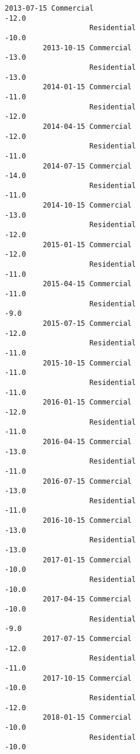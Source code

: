 \documentclass[11pt]{article}
\begin{document}
\begin{Verbatim}[commandchars=\\\{\}]
         2013-07-15 Commercial                                             -12.0   
                    Residential                                            -10.0   
         2013-10-15 Commercial                                             -13.0   
                    Residential                                            -13.0   
         2014-01-15 Commercial                                             -11.0   
                    Residential                                            -12.0   
         2014-04-15 Commercial                                             -12.0   
                    Residential                                            -11.0   
         2014-07-15 Commercial                                             -14.0   
                    Residential                                            -11.0   
         2014-10-15 Commercial                                             -13.0   
                    Residential                                            -12.0   
         2015-01-15 Commercial                                             -12.0   
                    Residential                                            -11.0   
         2015-04-15 Commercial                                             -11.0   
                    Residential                                             -9.0   
         2015-07-15 Commercial                                             -12.0   
                    Residential                                            -11.0   
         2015-10-15 Commercial                                             -11.0   
                    Residential                                            -11.0   
         2016-01-15 Commercial                                             -12.0   
                    Residential                                            -11.0   
         2016-04-15 Commercial                                             -13.0   
                    Residential                                            -11.0   
         2016-07-15 Commercial                                             -13.0   
                    Residential                                            -11.0   
         2016-10-15 Commercial                                             -13.0   
                    Residential                                            -13.0   
         2017-01-15 Commercial                                             -10.0   
                    Residential                                            -10.0   
         2017-04-15 Commercial                                             -10.0   
                    Residential                                             -9.0   
         2017-07-15 Commercial                                             -12.0   
                    Residential                                            -11.0   
         2017-10-15 Commercial                                             -10.0   
                    Residential                                            -12.0   
         2018-01-15 Commercial                                             -10.0   
                    Residential                                            -10.0   
         

\end{Verbatim}
\end{document}
